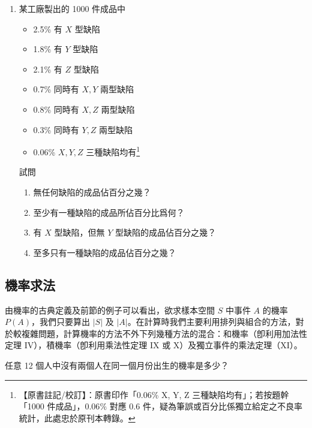 \begin{enumerate}[label=\textbf{\arabic*.}]
  \item 某工廠製出的 1000 件成品中
  \begin{itemize}[leftmargin=2.5em, itemsep=0.1em]
    \item[] 2.5\% 有 $X$ 型缺陷
    \item[] 1.8\% 有 $Y$ 型缺陷
    \item[] 2.1\% 有 $Z$ 型缺陷
    \item[] 0.7\% 同時有 $X, Y$ 兩型缺陷
    \item[] 0.8\% 同時有 $X, Z$ 兩型缺陷
    \item[] 0.3\% 同時有 $Y, Z$ 兩型缺陷
    \item[] 0.06\% $X, Y, Z$ 三種缺陷均有\label{note:b5s-ch3-p105-q6}\footnote{【原書註記/校訂】：原書印作「0.06\% X, Y, Z 三種缺陷均有」；若按題幹「1000 件成品」，$0.06\%$ 對應 0.6 件，疑為筆誤或百分比係獨立給定之不良率統計，此處忠於原刊本轉錄。}
  \end{itemize}
  試問
  \begin{enumerate}[label=(\arabic*)]
    \item 無任何缺陷的成品佔百分之幾？
    \item 至少有一種缺陷的成品所佔百分比爲何？
    \item 有 $X$ 型缺陷，但無 $Y$ 型缺陷的成品佔百分之幾？
    \item 至多只有一種缺陷的成品佔百分之幾？
  \end{enumerate}
\end{enumerate}

\subsection{機率求法}\label{sec:b5s-3-2}

由機率的古典定義及前節的例子可以看出，欲求樣本空間 $S$ 中事件 $A$ 的機率 $P(A)$，我們只要算出 $|S|$ 及 $|A|$。在計算時我們主要利用排列與組合的方法，對於較複雜問題，計算機率的方法不外下列幾種方法的混合：和機率（卽利用加法性定理 $\mathrm{IV}$），積機率（卽利用乘法性定理 $\mathrm{IX}$ 或 $\mathrm{X}$）及獨立事件的乘法定理（$\mathrm{XI}$）。

\vspace{1em}
\begin{example}\label{ex:b5s-3-5}
任意 12 個人中沒有兩個人在同一個月份出生的機率是多少？
\end{example}
